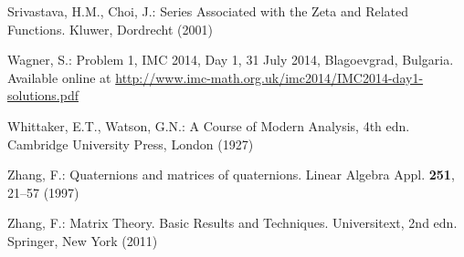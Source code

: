 \begin{thebibliography}{99}
  Srivastava, H.M., Choi, J.: Series Associated with the Zeta and Related Functions. Kluwer, Dordrecht (2001)

  Wagner, S.: Problem 1, IMC 2014, Day 1, 31 July 2014, Blagoevgrad, Bulgaria. Available online at \href{http://www.imc-math.org.uk/imc2014/IMC2014-day1-solutions.pdf}{http://www.imc-math.org.uk/imc2014/IMC2014-day1-solutions.pdf}

  Whittaker, E.T., Watson, G.N.: A Course of Modern Analysis, 4th edn. Cambridge University Press, London (1927)

  Zhang, F.: Quaternions and matrices of quaternions. Linear Algebra Appl. \textbf{251}, 21–57 (1997)

  Zhang, F.: Matrix Theory. Basic Results and Techniques. Universitext, 2nd edn. Springer, New York (2011)

\end{thebibliography} 